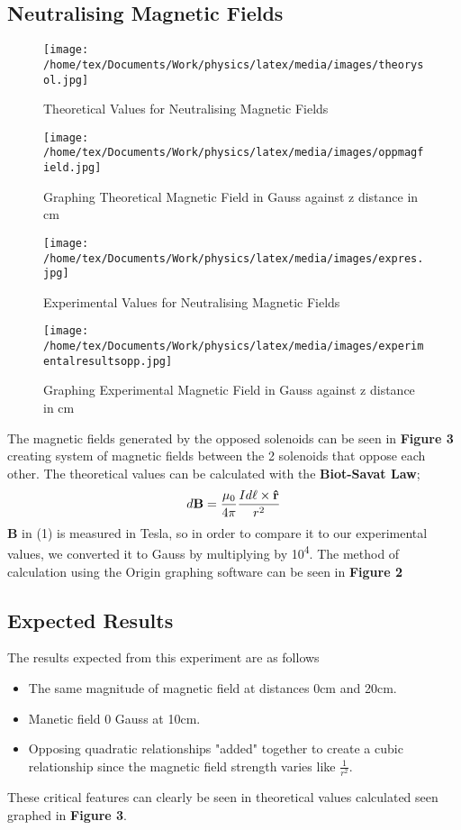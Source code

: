 \documentclass{article}
\begin{document}
   \subsection{Neutralising Magnetic Fields}
   \begin{figure}
       \centering
       \texttt{[image: /home/tex/Documents/Work/physics/latex/media/images/theorysol.jpg]}
       \caption{Theoretical Values for Neutralising Magnetic Fields}
   \end{figure}
   \begin{figure}
       \centering
       \texttt{[image: /home/tex/Documents/Work/physics/latex/media/images/oppmagfield.jpg]}
       \caption{Graphing Theoretical Magnetic Field in Gauss against z distance in cm}
   \end{figure}
   \begin{figure}
       \centering
       \texttt{[image: /home/tex/Documents/Work/physics/latex/media/images/expres.jpg]}
       \caption{Experimental Values for Neutralising Magnetic Fields}
   \end{figure}
   \begin{figure}
       \centering
       \texttt{[image: /home/tex/Documents/Work/physics/latex/media/images/experimentalresultsopp.jpg]}
       \caption{Graphing Experimental Magnetic Field in Gauss against z distance in cm}
   \end{figure}
   The magnetic fields generated by the opposed solenoids can be seen in \textbf{Figure 3}
   creating system of magnetic fields between the 2 solenoids that oppose each other. The theoretical values can be calculated
   with the \textbf{Biot-Savat Law};
   \begin{equation}
       d{\bf{B}} = \frac{{\mu _0 }}{{4\pi }}\frac{{Id\ell \times {\bf{\hat r}}}}{{r^2 }}
   \end{equation}
   \textbf{B} in (1) is measured in Tesla, so in order to compare it to our experimental values, we converted it to Gauss by
   multiplying by 10\textsuperscript{4}. \newline
   The method of calculation using the Origin graphing software can be seen in \textbf{Figure 2}
   \subsection{Expected Results}
   The results expected from this experiment are as follows
   \begin{itemize}
       \item The same magnitude of magnetic field at distances 0cm and 20cm.
       \item Manetic field 0 Gauss at 10cm.
       \item Opposing quadratic relationships "added" together to create a cubic relationship since the magnetic field strength varies like \(\frac{1}{r^2}\).
   \end{itemize}
   These critical features can clearly be seen in theoretical values calculated seen graphed in \textbf{Figure 3}.
\end{document}

